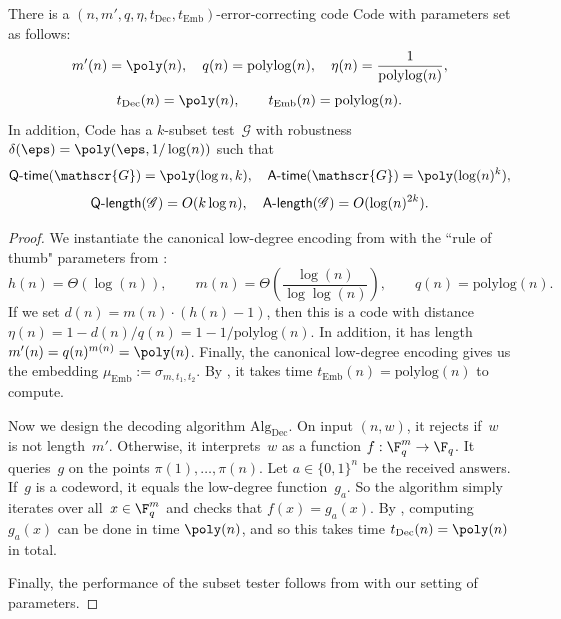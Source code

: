 \documentclass[11pt]{article}
\newcommand{\codec}{\mathrm{Code}}
\newcommand{\coded}{\mathrm{Dec}}
\newcommand{\game}{\mathscr{G}}
\newcommand{\qtime}[1]{\mathsf{Q}\textnormal{-}\mathsf{time}(#1)}
\newcommand{\atime}[1]{\mathsf{A}\textnormal{-}\mathsf{time}(#1)}
\newcommand{\qlength}[1]{\mathsf{Q}\textnormal{-}\mathsf{length}(#1)}
\newcommand{\alength}[1]{\mathsf{A}\textnormal{-}\mathsf{length}(#1)}
\begin{document}
\begin{fact}\label{fact:low-degree-code-is-efficient}
There is a $(n, m', q, \eta, t_{\mathrm{Dec}}, t_{\mathrm{Emb}})$-error-correcting code $\codec$ with parameters set as follows:
\begin{equation*}
m'(n) = \poly(n), \quad q(n) = \mathrm{polylog}(n), \quad \eta(n) = \frac{1}{\mathrm{polylog}(n)},
\end{equation*}
\begin{equation*}
t_{\mathrm{Dec}}(n) = \poly(n), \qquad t_{\mathrm{Emb}}(n) = \mathrm{polylog}(n).
\end{equation*}
In addition, $\codec$ has a $k$-subset test~$\game$ with robustness $\delta(\eps) = \poly(\eps, 1/\log(n))$ such that
\begin{equation*}
\qtime{\game} = \poly(\log n, k),
\quad
\atime{\game} = \poly(\log(n)^k),
\end{equation*}
\begin{equation*}
\qlength{\game} = O(k \log n),
\quad
\alength{\game} = O(\log(n)^{2k}).
\end{equation*}
\end{fact}
\begin{proof}
We instantiate the canonical low-degree encoding from  with the ``rule of thumb" parameters from :
\begin{equation*}
h(n) = \Theta(\log(n)),
\qquad
m(n) = \Theta\left(\frac{\log(n)}{\log\log(n)}\right),
\qquad
q(n) = \mathrm{polylog}(n).
\end{equation*}
If we set $d(n) = m(n)\cdot (h(n) - 1)$, then this is a code with distance $\eta(n) = 1-d(n)/q(n) = 1-1/\mathrm{polylog}(n)$.
In addition, it has length $m'(n) = q(n)^{m(n)} = \poly(n)$.
Finally, the canonical low-degree encoding gives us the embedding $\mu_{\mathrm{Emb}} := \sigma_{m, t_1, t_2}$.
By , it takes time $t_{\mathrm{Emb}}(n) = \mathrm{poly log}(n)$ to compute.

Now we design the decoding algorithm $\mathrm{Alg}_{\coded}$.
On input $(n, w)$, it rejects if~$w$ is not length~$m'$.
Otherwise, it interprets~$w$ as a function $f:\F_q^m\rightarrow \F_q$.
It queries~$g$ on the points $\pi(1), \ldots, \pi(n)$.
Let $a \in \{0, 1\}^n$ be the received answers.
If~$g$ is a codeword, it equals the low-degree function~$g_a$.
So the algorithm simply iterates over all~$x \in \F_q^m$ and checks that $f(x) = g_a(x)$.
By , computing $g_a(x)$ can be done in time $\poly(n)$,
and so this takes time $t_{\mathrm{Dec}}(n) = \poly(n)$ in total.

Finally, the performance of the subset tester follows from  with our setting of parameters.
\end{proof}
\end{document}
